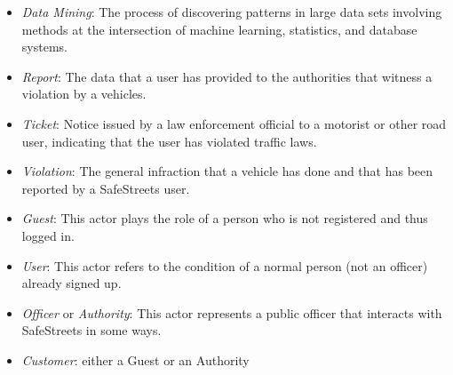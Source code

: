 \begin{itemize}
	\item \textit{Data Mining}: The process of discovering patterns in large data sets involving methods at the intersection of machine learning, statistics, and database systems.
	\item \textit{Report}: The data that a user has provided to the authorities that witness a violation by a vehicles.
	\item \textit{Ticket}: Notice issued by a law enforcement official to a motorist or other road user, indicating that the user has violated traffic laws.
	\item \textit{Violation}: The general infraction that a vehicle has done and that has been reported by a SafeStreets user.
	\item \textit{Guest}: This actor plays the role of a person who is not registered and thus logged in.
	\item \textit{User}: This actor refers to the condition of a normal person (not an officer) already signed up.
	\item \textit{Officer} or \textit{Authority}: This actor represents a public officer that interacts with SafeStreets in some ways.
	\item \textit{Customer}: either a Guest or an Authority
\end{itemize}